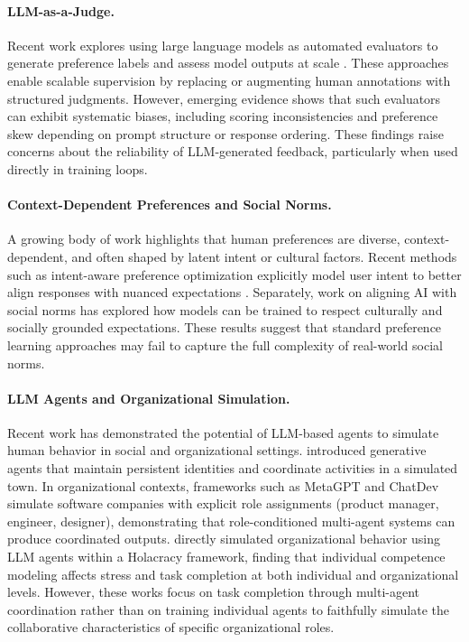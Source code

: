 \documentclass{article}
\begin{document}
\paragraph{LLM-as-a-Judge.}
Recent work explores using large language models as automated evaluators to generate preference labels and assess model outputs at scale \citep{zheng2023judging}. These approaches enable scalable supervision by replacing or augmenting human annotations with structured judgments. However, emerging evidence shows that such evaluators can exhibit systematic biases, including scoring inconsistencies and preference skew depending on prompt structure or response ordering. These findings raise concerns about the reliability of LLM-generated feedback, particularly when used directly in training loops.

\paragraph{Context-Dependent Preferences and Social Norms.}
A growing body of work highlights that human preferences are diverse, context-dependent, and often shaped by latent intent or cultural factors. Recent methods such as intent-aware preference optimization explicitly model user intent to better align responses with nuanced expectations \citep{yang2024rewards}. Separately, work on aligning AI with social norms \citep{fung2024massively} has explored how models can be trained to respect culturally and socially grounded expectations. These results suggest that standard preference learning approaches may fail to capture the full complexity of real-world social norms.

\paragraph{LLM Agents and Organizational Simulation.}
Recent work has demonstrated the potential of LLM-based agents to simulate human behavior in social and organizational settings. \citet{park2023generative} introduced generative agents that maintain persistent identities and coordinate activities in a simulated town. In organizational contexts, frameworks such as MetaGPT \citep{hong2023metagpt} and ChatDev \citep{qian2024chatdev} simulate software companies with explicit role assignments (product manager, engineer, designer), demonstrating that role-conditioned multi-agent systems can produce coordinated outputs. \citet{li2024holacracy} directly simulated organizational behavior using LLM agents within a Holacracy framework, finding that individual competence modeling affects stress and task completion at both individual and organizational levels. However, these works focus on task completion through multi-agent coordination rather than on training individual agents to faithfully simulate the collaborative characteristics of specific organizational roles.
\end{document}
